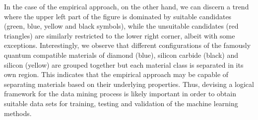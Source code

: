 \documentclass[superscriptaddress,unsortedaddress,
 amsmath,amssymb,
 aps,
]{revtex4-2}
\begin{document}
In the case of the empirical approach, on the other hand, we can discern a trend where the upper left part of the figure is dominated by suitable candidates (green, blue, yellow and black symbols), while the unsuitable candidates (red triangles) are similarly restricted to the lower right corner, albeit with some exceptions. 
Interestingly, we observe that different configurations of the famously quantum compatible materials of diamond (blue), silicon carbide (black) and silicon (yellow) are grouped together but each material class is separated in its own region. 
This indicates that the empirical approach may be capable of separating materials based on their underlying properties. Thus, devising a logical framework for the data mining process is likely important in order to obtain suitable data sets for training, testing and validation of the machine learning methods. 

\end{document}
